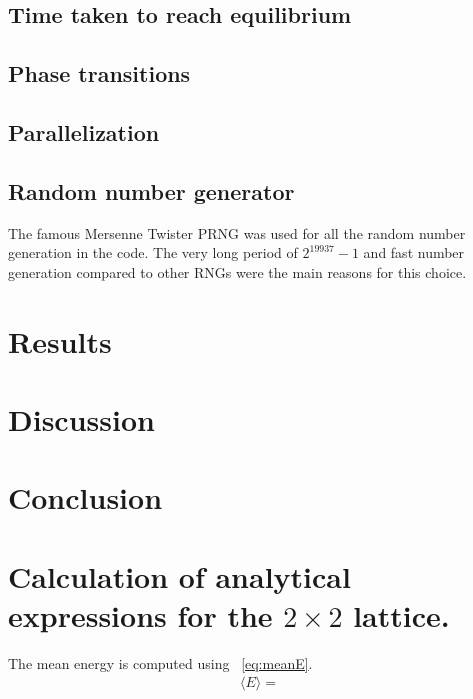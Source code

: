 \documentclass[aps,reprint]{revtex4-1}
\newcommand\blankpage{%
  \null
  \thispagestyle{empty}%
  \addtocounter{page}{-1}%
  \newpage}
\newcommand{\mean}[1]{\langle #1 \rangle}
\begin{document}
\subsection{Time taken to reach equilibrium}

\subsection{Phase transitions}

\subsection{Parallelization}

\subsection{Random number generator}
The famous Mersenne Twister PRNG was used for all the random number generation
in the code. The very long period of $2^{19937} - 1$ and fast number generation
compared to other RNGs were the main reasons for this choice.
\section{Results} \label{sec:results}

\section{Discussion} \label{sec:discussion}

\section{Conclusion} \label{sec:conclusion}


\blankpage
\appendix
\section{Calculation of analytical expressions for the $2\times2$ lattice.} \label{sec:app}
The mean energy is computed using ~\ref{eq:meanE}.
\begin{align*}
  \mean{E} =
\end{align*}
\blankpage
\end{document}

